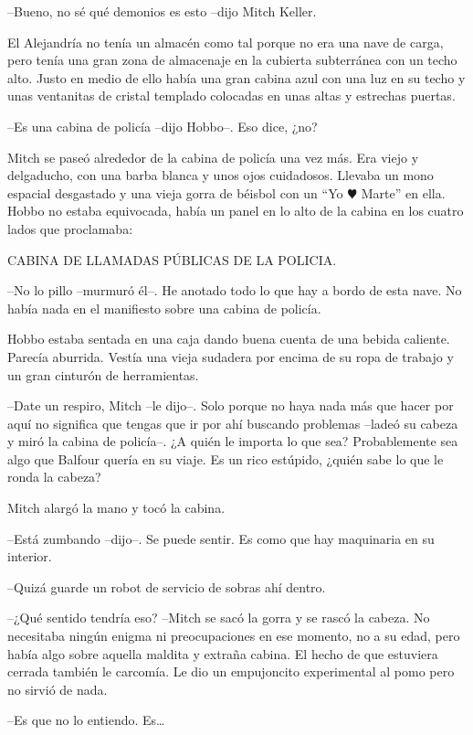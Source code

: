 {--Bueno, no sé qué demonios es esto --dijo
Mitch Keller.}

{El Alejandría no tenía un almacén como tal porque no era una nave de
 carga, pero tenía una gran zona de almacenaje en la cubierta subterránea
 con un techo alto. Justo en medio de ello había una gran cabina azul con
 una luz en su techo y unas ventanitas de cristal templado colocadas en
unas altas y estrechas puertas.}

{--Es una cabina de policía --dijo Hobbo--. Eso dice, ¿no?}

{Mitch se paseó alrededor de la cabina de policía una vez más. Era viejo
 y delgaducho, con una barba blanca y unos ojos cuidadosos. Llevaba un
 mono espacial desgastado y una vieja gorra de béisbol con un
 ``Yo \( \varheart \) Marte'' en ella. Hobbo no estaba equivocada, había un panel
en lo alto de la cabina en los cuatro lados que proclamaba:}

{CABINA DE LLAMADAS PÚBLICAS DE LA POLICIA.}

{--No lo pillo --murmuró él--. He anotado todo lo que hay a bordo de esta
nave. No había nada en el manifiesto sobre una cabina de policía.}

{Hobbo estaba sentada en una caja dando buena cuenta de una bebida
 caliente. Parecía aburrida. Vestía una vieja sudadera por encima de su
ropa de trabajo y un gran cinturón de herramientas.}

{--Date un respiro, Mitch --le dijo--. Solo porque no haya nada más que
 hacer por aquí no significa que tengas que ir por ahí buscando problemas
 --ladeó su cabeza y miró la cabina de policía--. ¿A quién le importa lo
 que sea? Probablemente sea algo que Balfour quería en su viaje. Es un
rico estúpido, ¿quién sabe lo que le ronda la cabeza?}

{Mitch alargó la mano y tocó la cabina.}

{--Está zumbando --dijo--. Se puede sentir. Es como que hay maquinaria en
su interior.}

{--Quizá guarde un robot de servicio de sobras ahí dentro.}

{--¿Qué sentido tendría eso? --Mitch se sacó la gorra y se rascó la
 cabeza. No necesitaba ningún enigma ni preocupaciones en ese momento, no
 a su edad, pero había algo sobre aquella maldita y extraña cabina. El
 hecho de que estuviera cerrada también le carcomía. Le dio un
empujoncito experimental al pomo pero no sirvió de nada.}

{--Es que no lo entiendo. Es\ldots{}}

